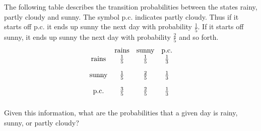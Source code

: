 \begin{ex} The following table describes the transition probabilities between the
states rainy, partly cloudy and sunny. The symbol p.c. indicates partly
cloudy. Thus if it starts off p.c. it ends up sunny the next day with
probability $\frac{1}{5}$. If it starts off sunny, it ends up sunny the next
day with probability $\frac{2}{5}$ and so forth.
\begin{equation*}
\begin{array}{cccc}
& \text{rains} & \text{sunny} & \text{p.c.} \\
\text{rains} & \vspace{0.05in}\frac{1}{5} & \vspace{0.05in}\frac{1}{5} & \vspace{0.05in}\frac{1}{3} \\
\text{sunny} & \vspace{0.05in}\frac{1}{5} & \vspace{0.05in}\frac{2}{5} & \vspace{0.05in}\frac{1}{3} \\
\text{p.c.} & \vspace{0.05in}\frac{3}{5} & \vspace{0.05in}\frac{2}{5} & \vspace{0.05in}\frac{1}{3}
\end{array}
\end{equation*}
Given this information, what are the probabilities that a given day is
rainy, sunny, or partly cloudy? \vspace{1mm}
\end{ex}

